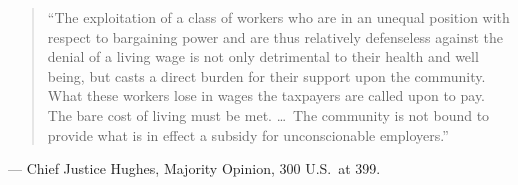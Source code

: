 \documentclass[12pt]{article}
\begin{document}
\begin{quote}
``The exploitation of a class of workers who are in an unequal position with respect to bargaining power and are thus relatively defenseless against the denial of a living wage is not only detrimental to their health and well being, but casts a direct burden for their support upon the community. What these workers lose in wages the taxpayers are called upon to pay. The bare cost of living must be met. \ldots\ The community is not bound to provide what is in effect a subsidy for unconscionable employers.''
\end{quote}
\noindent --- Chief Justice Hughes, Majority Opinion, 300 U.S.\ at 399.
\end{document}
